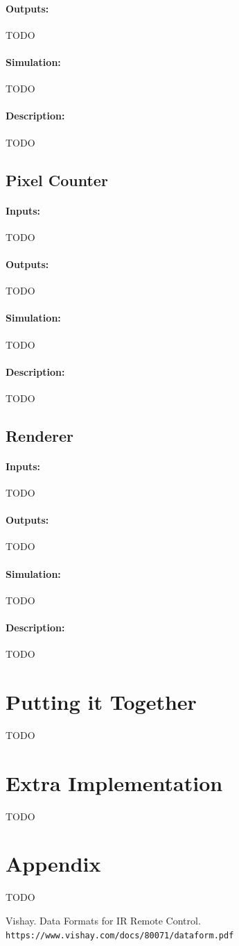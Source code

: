 \documentclass[]{article}
\begin{document}
\paragraph{Outputs:} TODO
\paragraph{Simulation:} TODO
\paragraph{Description:} TODO

\subsection{Pixel Counter}
\paragraph{Inputs:} TODO
\paragraph{Outputs:} TODO
\paragraph{Simulation:} TODO
\paragraph{Description:} TODO

\subsection{Renderer}
\paragraph{Inputs:} TODO
\paragraph{Outputs:} TODO
\paragraph{Simulation:} TODO
\paragraph{Description:} TODO

\section{Putting it Together}
TODO

\section{Extra Implementation}
TODO
\section{Appendix}
TODO

\begin{thebibliography}{99}
    Vishay. Data Formats for IR Remote Control. 
    \\\texttt{https://www.vishay.com/docs/80071/dataform.pdf}
\end{thebibliography}
\end{document}
